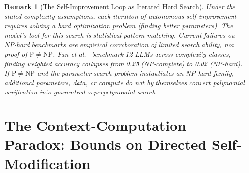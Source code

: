 \documentclass[11pt,a4paper]{article}
\newtheorem{remark}[theorem]{Remark}
\begin{document}
\begin{remark}[The Self-Improvement Loop as Iterated Hard Search]
Under the stated complexity assumptions, each iteration of autonomous self-improvement requires solving a hard optimization problem (finding better parameters). The model's tool for this search is statistical pattern matching. Current failures on NP-hard benchmarks are empirical corroboration of limited search ability, not proof of $\mathrm{P} \neq \mathrm{NP}$. Fan et al.~\cite{fan2023nphardeval} benchmark 12 LLMs across complexity classes, finding weighted accuracy collapses from 0.25 (NP-complete) to 0.02 (NP-hard). If $\mathrm{P} \neq \mathrm{NP}$ and the parameter-search problem instantiates an NP-hard family, additional parameters, data, or compute do not by themselves convert polynomial verification into guaranteed superpolynomial search.
\end{remark}

\section{The Context-Computation Paradox: Bounds on Directed Self-Modification}
\label{sec:context}
\end{document}
